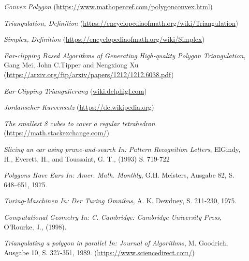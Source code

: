 \begin{thebibliography}{11}
    \emph{Convex Polygon} \break
    (\href{https://www.mathopenref.com/polygonconvex.html}{https://www.mathopenref.com/polygonconvex.html})
    
    \emph{Triangulation, Definition} \break
    (\href{https://encyclopediaofmath.org/wiki/Triangulation}{https://encyclopediaofmath.org/wiki/Triangulation})
    
    \emph{Simplex, Definition} \break
    (\href{https://encyclopediaofmath.org/wiki/Simplex}{https://encyclopediaofmath.org/wiki/Simplex})
    
    \emph{Ear-clipping Based Algorithms of Generating High-quality Polygon Triangulation}, Gang Mei, John C.Tipper and Nengxiong Xu \break 
    (\href{https://arxiv.org/ftp/arxiv/papers/1212/1212.6038.pdf}{https://arxiv.org/ftp/arxiv/papers/1212/1212.6038.pdf})
    
    \emph{Ear-Clipping Triangulierung} \break
    (\href{https://wiki.delphigl.com/index.php/Ear_Clipping_Triangulierung}{wiki.delphigl.com})
   
    \emph{Jordanscher Kurvensatz} \break
    (\href{https://de.wikipedia.org/wiki/Jordanscher_Kurvensatz}{https://de.wikipedia.org})

    \emph{The smallest 8 cubes to cover a regular tetrahedron} \break
    (\href{https://math.stackexchange.com/questions/1423014/the-smallest-8-cubes-to-cover-a-regular-tetrahedron}{https://math.stackexchange.com/})
  
    \emph{Slicing an ear using prune-and-search In: Pattern Recognition Letters}, ElGindy, H., Everett, H., and Toussaint, G. T., (1993) S. 719-722

    \emph{Polygons Have Ears In: Amer. Math. Monthly}, G.H. Meisters, Ausgabe 82, S. 648–651, 1975.

    \emph{Turing-Maschinen In: Der Turing Omnibus}, A. K. Dewdney, S. 211-230, 1975.

    \emph{Computational Geometry In: C. Cambridge: Cambridge University Press}, O’Rourke, J., (1998). 

    \emph{Triangulating a polygon in parallel In: Journal of Algorithms}, M. Goodrich, Ausgabe 10, S. 327-351, 1989. \break
    (\href{https://www.sciencedirect.com/science/article/pii/0196677489900321}{https://www.sciencedirect.com/})


\end{thebibliography}
